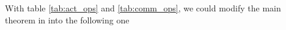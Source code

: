 With table \ref{tab:act_ops} and \ref{tab:comm_ops}, we could modify the main theorem in \cite{herrmann2019optimal} into the following one

    




